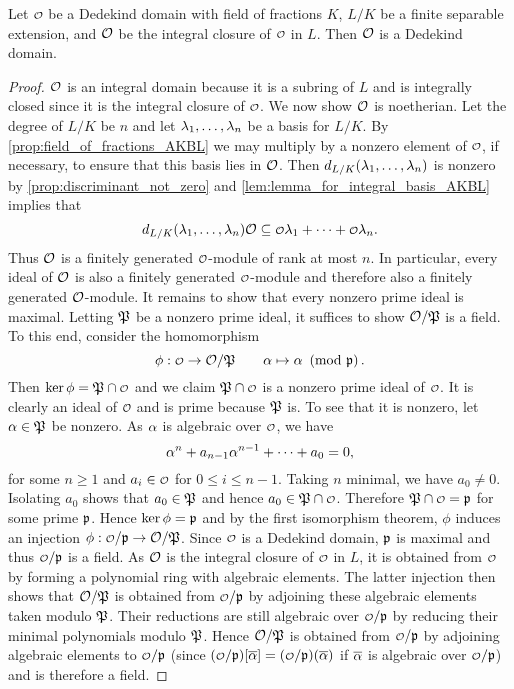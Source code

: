     \begin{proposition}\label{prop:integral_closure_of_Dedekind_is_Dedekind}
      Let $\smc{O}$ be a Dedekind domain with field of fractions $K$, $L/K$ be a finite separable extension, and $\mathcal{O}$ be the integral closure of $\smc{O}$ in $L$. Then $\mathcal{O}$ is a Dedekind domain.
    \end{proposition}
    \begin{proof}
      $\mathcal{O}$ is an integral domain because it is a subring of $L$ and is integrally closed since it is the integral closure of $\smc{O}$. We now show $\mathcal{O}$ is noetherian. Let the degree of $L/K$ be $n$ and let $\lambda_{1},\ldots,\lambda_{n}$ be a basis for $L/K$. By \cref{prop:field_of_fractions_AKBL} we may multiply by a nonzero element of $\smc{O}$, if necessary, to ensure that this basis lies in $\mathcal{O}$. Then $d_{L/K}(\lambda_{1},\ldots,\lambda_{n})$ is nonzero by \cref{prop:discriminant_not_zero} and \cref{lem:lemma_for_integral_basis_AKBL} implies that
      \[
        d_{L/K}(\l_{1},\ldots,\l_{n})\mc{O} \subseteq \smc{O}\l_{1}+\cdots+\smc{O}\l_{n}.
      \]
      Thus $\mathcal{O}$ is a finitely generated $\smc{O}$-module of rank at most $n$. In particular, every ideal of $\mathcal{O}$ is also a finitely generated $\smc{O}$-module and therefore also a finitely generated $\mathcal{O}$-module. It remains to show that every nonzero prime ideal is maximal. Letting $\mathfrak{P}$ be a nonzero prime ideal, it suffices to show $\mathcal{O}/\mathfrak{P}$ is a field. To this end, consider the homomorphism
      \[
        \phi:\smc{O} \to \mc{O}/\mf{P} \qquad \a \mapsto \a \tmod{\mf{p}}.
      \]
      Then $\ker\phi = \mf{P} \cap \smc{O}$ and we claim $\mf{P} \cap \smc{O}$ is a nonzero prime ideal of $\smc{O}$. It is clearly an ideal of $\smc{O}$ and is prime because $\mathfrak{P}$ is. To see that it is nonzero, let $\alpha \in \mathfrak{P}$ be nonzero. As $\alpha$ is algebraic over $\smc{O}$, we have
      \[
        \alpha^{n}+a_{n-1}\alpha^{n-1}+\cdots+a_{0} = 0,
      \]
      for some $n \ge 1$ and $a_{i} \in \smc{O}$ for $0 \le i \le n-1$. Taking $n$ minimal, we have $a_{0} \neq 0$. Isolating $a_{0}$ shows that $a_{0} \in \mathfrak{P}$ and hence $a_{0} \in \mf{P} \cap \smc{O}$. Therefore $\mf{P} \cap \smc{O} = \mf{p}$ for some prime $\mathfrak{p}$. Hence $\ker\phi = \mathfrak{p}$ and by the first isomorphism theorem, $\phi$ induces an injection $\phi:\smc{O}/\mf{p} \to \mc{O}/\mf{P}$. Since $\smc{O}$ is a Dedekind domain, $\mathfrak{p}$ is maximal and thus $\smc{O}/\mf{p}$ is a field. As $\mathcal{O}$ is the integral closure of $\smc{O}$ in $L$, it is obtained from $\smc{O}$ by forming a polynomial ring with algebraic elements. The latter injection then shows that $\mathcal{O}/\mathfrak{P}$ is obtained from $\smc{O}/\mf{p}$ by adjoining these algebraic elements taken modulo $\mathfrak{P}$. Their reductions are still algebraic over $\smc{O}/\mf{p}$ by reducing their minimal polynomials modulo $\mathfrak{P}$. Hence $\mathcal{O}/\mathfrak{P}$ is obtained from $\smc{O}/\mf{p}$ by adjoining algebraic elements to $\smc{O}/\mf{p}$ (since $(\smc{O}/\mf{p})[\conj{\a}] = (\smc{O}/\mf{p})(\conj{\a})$ if $\overline{\alpha}$ is algebraic over $\smc{O}/\mf{p}$) and is therefore a field.
    \end{proof}

